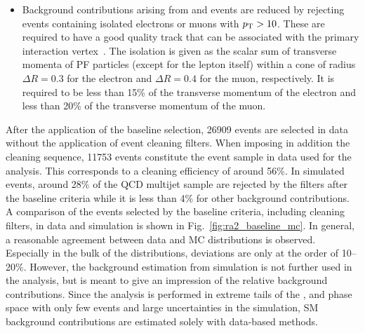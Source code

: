 \begin{itemize}
{are selected. The value of 0.5 is chosen according to the jet distance parameter. However, this is reduced in case of the third jet in order to retain signal efficiency. }
 \item{Background contributions arising from \ttbar and \WJets events are reduced by rejecting events containing isolated electrons or muons with $p_{\text{T}} > 10$\gev. These are required to have a good quality track that can be associated with the primary interaction vertex~\cite{CMS-PAS-EGM-10-004, CMS-PAS-MUO-10-002}. The isolation is given as the scalar sum of transverse momenta of PF particles (except for the lepton itself) within a cone of radius $\Delta R = 0.3$ for the electron and $\Delta R = 0.4$ for the muon, respectively. It is required to be less than 15\% of the transverse momentum of the electron and less than 20\% of the transverse momentum of the muon.}
\end{itemize}
After the application of the baseline selection, 26909 events are selected in data without the application of event cleaning filters. When imposing in addition the cleaning sequence, 11753 events constitute the event sample in data used for the analysis. This corresponds to a cleaning efficiency of around 56\%. In simulated events, around 28\% of the QCD multijet sample are rejected by the filters after the baseline criteria while it is less than 4\% for other background contributions. \\
A comparison of the events selected by the baseline criteria, including cleaning filters, in data and simulation is shown in Fig.~\ref{fig:ra2_baseline_mc}. In general, a reasonable agreement between data and MC distributions is observed. Especially in the bulk of the distributions, deviations are only at the order of 10--20\%. However, the background estimation from simulation is not further used in the analysis, but is meant to give an impression of the relative background contributions. Since the analysis is performed in extreme tails of the \HT, \MHT and \NJets phase space with only few events and large uncertainties in the simulation, SM background contributions are estimated solely with data-based methods.

